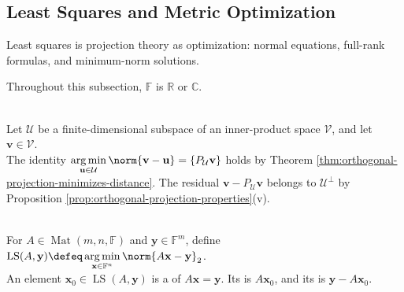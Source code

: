 \subsection{Least Squares and Metric Optimization}


%

Least squares is projection theory as optimization: normal equations, full-rank formulas, and minimum-norm solutions.

Throughout this subsection, $\mathbb{F}$ is $\mathbb{R}$ or $\mathbb{C}$.

\begin{principle} \label{pri:least-squares-projection-principle} \\
Let $\mathcal{U}$ be a finite-dimensional subspace of an inner-product space $\mathcal{V}$, and let $\mathbf{v}\in\mathcal{V}$.\\
The identity $\operatorname*{arg\,min}\limits_{\mathbf{u}\in\mathcal{U}}\norm{\mathbf{v}-\mathbf{u}}=\{P_{\mathcal{U}}\mathbf{v}\}$ holds by Theorem \ref{thm:orthogonal-projection-minimizes-distance}. The residual $\mathbf{v}-P_{\mathcal{U}}\mathbf{v}$ belongs to $\mathcal{U}^{\perp}$ by Proposition \ref{prop:orthogonal-projection-properties}(v).
\end{principle}

\begin{definition} \label{def:matrix-least-squares-solution} \\
For $A\in\operatorname{Mat}(m,n,\mathbb{F})$ and $\mathbf{y}\in\mathbb{F}^m$, define $\operatorname{LS}(A,\mathbf{y})\defeq\operatorname*{arg\,min}\limits_{\mathbf{x}\in\mathbb{F}^n}\norm{A\mathbf{x}-\mathbf{y}}_2$.\\
An element $\mathbf{x}_0\in\operatorname{LS}(A,\mathbf{y})$ is a  of $A\mathbf{x}=\mathbf{y}$. Its  is $A\mathbf{x}_0$, and its  is $\mathbf{y}-A\mathbf{x}_0$.
\end{definition}

